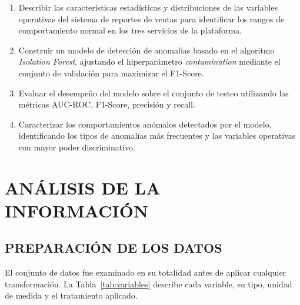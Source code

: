 \documentclass[12pt,letterpaper, oneside]{book}
\begin{document}
    \begin{enumerate}
        \item Describir las características estadísticas y distribuciones
        de las variables operativas del sistema de reportes de ventas para
        identificar los rangos de comportamiento normal en los tres
        servicios de la plataforma.

        \item Construir un modelo de detección de anomalías basado en el
        algoritmo \textit{Isolation Forest}, ajustando el hiperparámetro
        \textit{contamination} mediante el conjunto de validación para
        maximizar el F1-Score.

        \item Evaluar el desempeño del modelo sobre el conjunto de testeo
        utilizando las métricas AUC-ROC, F1-Score, precisión y recall.

        \item Caracterizar los comportamientos anómalos detectados por el
        modelo, identificando los tipos de anomalías más frecuentes y
        las variables operativas con mayor poder discriminativo.
    \end{enumerate}

    \chapter{ANÁLISIS DE LA INFORMACIÓN}

    \section{PREPARACIÓN DE LOS DATOS}

    El conjunto de datos fue examinado en su totalidad antes de aplicar
    cualquier transformación. La Tabla~\ref{tab:variables} describe cada
    variable, su tipo, unidad de medida y el tratamiento aplicado.
\end{document}
